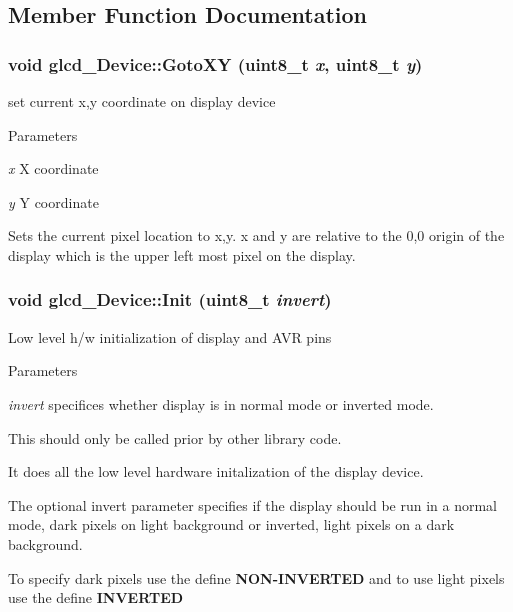 \subsection{Member Function Documentation}
\hypertarget{classglcd___device_ad5fd910ef008e2d04e8d9b4fd8cac543}{
\subsubsection[{GotoXY}]{\setlength{\rightskip}{0pt plus 5cm}void glcd\_\-Device::GotoXY (uint8\_\-t {\em x}, \/  uint8\_\-t {\em y})}}
\label{classglcd___device_ad5fd910ef008e2d04e8d9b4fd8cac543}
set current x,y coordinate on display device


\begin{DoxyParams}{Parameters}
\item[{\em x}]X coordinate \item[{\em y}]Y coordinate\end{DoxyParams}
Sets the current pixel location to x,y. x and y are relative to the 0,0 origin of the display which is the upper left most pixel on the display. \hypertarget{classglcd___device_a15bd97b27644f9962f2e50a442b4cdcc}{
\subsubsection[{Init}]{\setlength{\rightskip}{0pt plus 5cm}void glcd\_\-Device::Init (uint8\_\-t {\em invert})}}
\label{classglcd___device_a15bd97b27644f9962f2e50a442b4cdcc}
Low level h/w initialization of display and AVR pins


\begin{DoxyParams}{Parameters}
\item[{\em invert}]specifices whether display is in normal mode or inverted mode.\end{DoxyParams}
This should only be called prior by other library code.

It does all the low level hardware initalization of the display device.

The optional invert parameter specifies if the display should be run in a normal mode, dark pixels on light background or inverted, light pixels on a dark background.

To specify dark pixels use the define {\bfseries NON-\/INVERTED} and to use light pixels use the define {\bfseries INVERTED} 

